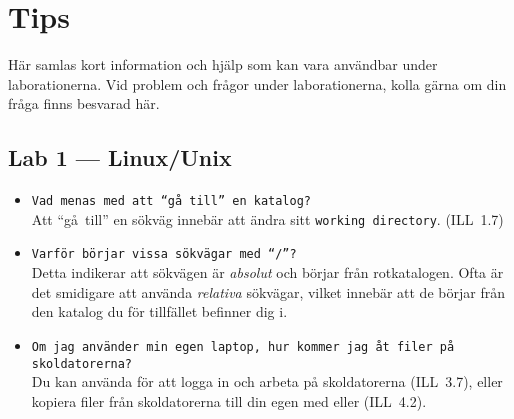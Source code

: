 \documentclass[fleqn, article, a4paper]{memoir}
\begin{document}
\newpage
\section{Tips}
\label{sec:tips}

Här samlas kort information och hjälp som kan vara användbar under laborationerna. Vid problem och frågor under laborationerna, kolla gärna om din fråga finns besvarad här.

\subsection{Lab 1 --- Linux/Unix}
\begin{itemize}
	\item \texttt{Vad menas med att ``gå till'' en katalog?}\\
	      Att ``gå~till'' en sökväg innebär att ändra sitt \texttt{working directory}. (ILL~1.7)
	\item \texttt{Varför börjar vissa sökvägar med ``/''?}\\
	      Detta indikerar att sökvägen är \emph{absolut} och börjar från rotkatalogen. Ofta är det smidigare att använda \emph{relativa} sökvägar, vilket innebär att de börjar från den katalog du för tillfället befinner dig i.
	\item \texttt{Om jag använder min egen laptop, hur kommer jag åt filer på skoldatorerna?}\\
	      Du kan använda  för att logga in och arbeta på skoldatorerna (ILL~3.7), eller kopiera filer från skoldatorerna till din egen med  eller  (ILL~4.2).
\end{itemize}
\end{document}
